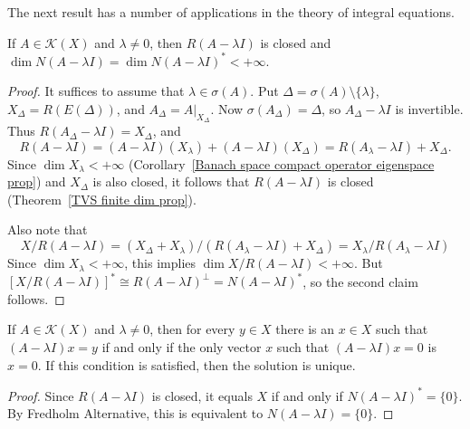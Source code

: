 The next result has a number of applications in the theory of integral equations.
\begin{theorem}
If $A\in\mathcal{K}(X)$ and $\lambda\neq 0$, then $R(A-\lambda I)$ is closed and $\dim N(A-\lambda I)=\dim N(A-\lambda I)^*<+\infty$.
\end{theorem}
\begin{proof}
It suffices to assume that $\lambda\in\sigma(A)$. Put $\Delta=\sigma(A)\setminus\{\lambda\}$, $X_\Delta=R(E(\Delta))$, and $A_\Delta=A|_{X_\Delta}$. Now $\sigma(A_\Delta)=\Delta$, so $A_\Delta-\lambda I$ is invertible. Thus $R(A_\Delta-\lambda I)=X_\Delta$, and
\[R(A-\lambda I)=(A-\lambda I)(X_\lambda)+(A-\lambda I)(X_\Delta)=R(A_\lambda-\lambda I)+X_\Delta.\]
Since $\dim X_\lambda<+\infty$ (Corollary~\ref{Banach space compact operator eigenspace prop}) and $X_\Delta$ is also closed, it follows that $R(A-\lambda I)$ is closed (Theorem~\ref{TVS finite dim prop}).\par
Also note that
\[X/R(A-\lambda I)=(X_\Delta+X_\lambda)/(R(A_\lambda-\lambda I)+X_\Delta)=X_\lambda/R(A_\lambda-\lambda I)\]
Since $\dim X_\lambda<+\infty$, this implies $\dim X/R(A-\lambda I)<+\infty$. But $[X/R(A-\lambda I)]^*\cong R(A-\lambda I)^\bot=N(A-\lambda I)^*$, so the second claim follows.
\end{proof}
\begin{corollary}
If $A\in\mathcal{K}(X)$ and $\lambda\neq 0$, then for every $y\in X$ there is an $x\in X$ such that $(A-\lambda I)x=y$ if and only if the only vector $x$ such that $(A-\lambda I)x=0$ is $x=0$. If this condition is satisfied, then the solution is unique.
\end{corollary}
\begin{proof}
Since $R(A-\lambda I)$ is closed, it equals $X$ if and only if $N(A-\lambda I)^*=\{0\}$. By Fredholm Alternative, this is equivalent to $N(A-\lambda I)=\{0\}$.
\end{proof}
